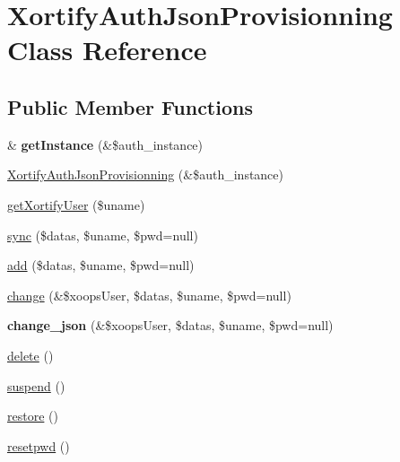 \hypertarget{class_xortify_auth_json_provisionning}{\section{Xortify\-Auth\-Json\-Provisionning Class Reference}
\label{class_xortify_auth_json_provisionning}
}
\subsection*{Public Member Functions}
\begin{DoxyCompactItemize}
\item 
\hypertarget{class_xortify_auth_json_provisionning_a8ea1aa8cf6ffc7e7ae6daf2beb3b1cbb}{\& {\bfseries get\-Instance} (\&\$auth\-\_\-instance)}\label{class_xortify_auth_json_provisionning_a8ea1aa8cf6ffc7e7ae6daf2beb3b1cbb}

\item 
\hyperlink{class_xortify_auth_json_provisionning_a91f2013c85cb34c90ea34d697293961e}{Xortify\-Auth\-Json\-Provisionning} (\&\$auth\-\_\-instance)
\item 
\hyperlink{class_xortify_auth_json_provisionning_a72f90f2fe64b22cc91a4d09f350e7c35}{get\-Xortify\-User} (\$uname)
\item 
\hyperlink{class_xortify_auth_json_provisionning_a1fc3dbe1046aaf9499d9acecb64b071b}{sync} (\$datas, \$uname, \$pwd=null)
\item 
\hyperlink{class_xortify_auth_json_provisionning_a48fe779ddfe401a085cb4140b3ce204a}{add} (\$datas, \$uname, \$pwd=null)
\item 
\hyperlink{class_xortify_auth_json_provisionning_a3ef969c7a511bddfbc772023c4232bbc}{change} (\&\$xoops\-User, \$datas, \$uname, \$pwd=null)
\item 
\hypertarget{class_xortify_auth_json_provisionning_ad52cf327915b203a767ffdd65ab80060}{{\bfseries change\-\_\-json} (\&\$xoops\-User, \$datas, \$uname, \$pwd=null)}\label{class_xortify_auth_json_provisionning_ad52cf327915b203a767ffdd65ab80060}

\item 
\hyperlink{class_xortify_auth_json_provisionning_af8b376ef8953fb711f820adb28888933}{delete} ()
\item 
\hyperlink{class_xortify_auth_json_provisionning_a7e537af6ffc3bb7d4b79ed7c171b7e1f}{suspend} ()
\item 
\hyperlink{class_xortify_auth_json_provisionning_a99a4282acd581541a5957664059943c4}{restore} ()
\item 
\hyperlink{class_xortify_auth_json_provisionning_af86e181f2ff4a8e47735429b2053d2fd}{resetpwd} ()
\end{DoxyCompactItemize}

